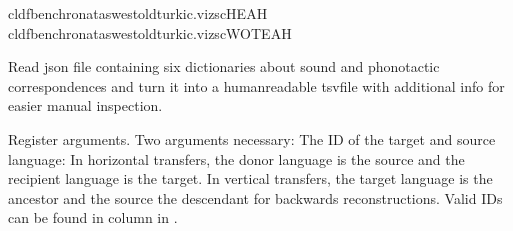 \documentclass[letterpaper,10pt,english]{sphinxmanual}
\begin{document}
\begin{sphinxVerbatim}[commandchars=\\\{\}]
cldfbenchronataswestoldturkic.vizscHEAH
cldfbenchronataswestoldturkic.vizscWOTEAH
\end{sphinxVerbatim}
\label{\detokenize{mkloanpy:module-ronataswestoldturkiccommands.vizsc}}
\sphinxAtStartPar
Read json file containing six dictionaries about sound and phonotactic
correspondences and turn it into a human\sphinxhyphen{}readable tsv\sphinxhyphen{}file with additional
info for easier manual inspection.

\begin{fulllineitems}
\label{\detokenize{mkloanpy:ronataswestoldturkiccommands.vizsc.register}}
\pysigstartsignatures
{}
\pysigstopsignatures
\sphinxAtStartPar
Register arguments. Two arguments necessary: The ID of the target and
source language: In horizontal transfers, the donor language is the source
and the recipient language is the target. In vertical transfers, the
target language is the ancestor and the source the descendant for backwards
reconstructions. Valid IDs can be found in
column  in .

\end{fulllineitems}

\end{document}
